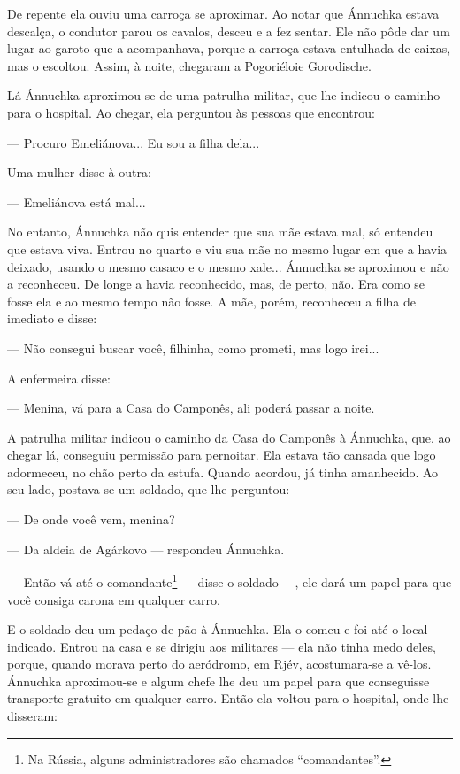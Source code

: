 De repente ela ouviu uma carroça se aproximar. Ao notar que Ánnuchka
estava descalça, o condutor parou os cavalos, desceu e a fez sentar. Ele
não pôde dar um lugar ao garoto que a acompanhava, porque a carroça
estava entulhada de caixas, mas o escoltou. Assim, à noite, chegaram a
Pogoriéloie Gorodische.

Lá Ánnuchka aproximou-se de uma patrulha militar, que lhe indicou o
caminho para o hospital. Ao chegar, ela perguntou às pessoas que
encontrou:

--- Procuro Emeliánova... Eu sou a filha dela...

Uma mulher disse à outra:

--- Emeliánova está mal...

No entanto, Ánnuchka não quis entender que sua mãe estava mal, só
entendeu que estava viva. Entrou no quarto e viu sua mãe no mesmo lugar
em que a havia deixado, usando o mesmo casaco e o mesmo xale... Ánnuchka
se aproximou e não a reconheceu. De longe a havia reconhecido, mas, de
perto, não. Era como se fosse ela e ao mesmo tempo não fosse. A mãe,
porém, reconheceu a filha de imediato e disse:

--- Não consegui buscar você, filhinha, como prometi, mas logo irei...

A enfermeira disse:

--- Menina, vá para a Casa do Camponês, ali poderá passar a noite.

A patrulha militar indicou o caminho da Casa do Camponês à Ánnuchka,
que, ao chegar lá, conseguiu permissão para pernoitar. Ela estava tão
cansada que logo adormeceu, no chão perto da estufa. Quando acordou, já
tinha amanhecido. Ao seu lado, postava-se um soldado, que lhe perguntou:

--- De onde você vem, menina?

--- Da aldeia de Agárkovo --- respondeu Ánnuchka.

--- Então vá até o comandante\footnote{Na Rússia, alguns administradores
  são chamados ``comandantes''.} --- disse o soldado ---, ele dará um
papel para que você consiga carona em qualquer carro.

E o soldado deu um pedaço de pão à Ánnuchka. Ela o comeu e foi até o
local indicado. Entrou na casa e se dirigiu aos militares --- ela não
tinha medo deles, porque, quando morava perto do aeródromo, em Rjév,
acostumara-se a vê-los. Ánnuchka aproximou-se e algum chefe lhe deu um
papel para que conseguisse transporte gratuito em qualquer carro. Então
ela voltou para o hospital, onde lhe disseram:

